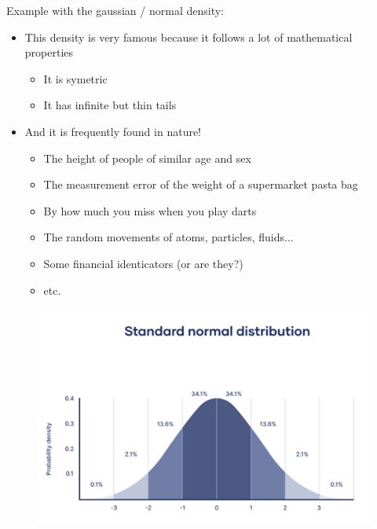 \documentclass[compress]{beamer}
\begin{document}
\begin{frame}
	Example with the gaussian / normal density:
	\vspace{0.2cm}
	\begin{itemize}
		\item This density is very famous because it follows a lot of mathematical properties
		\begin{itemize}
			\item It is symetric
			\item It has infinite but thin tails
		\end{itemize}
		\vspace{0.2cm}
		\item And it is frequently found in nature!
		\begin{itemize}
			\item The height of people of similar age and sex
			\item The measurement error of the weight of a supermarket pasta bag
			\item By how much you miss when you play darts
			\item The random movements of atoms, particles, fluids...
			\item Some financial identicators (or are they?)
			\item etc.
		\end{itemize}
	\end{itemize}
\end{frame}

\begin{frame}
	\begin{figure}
		\centering
		\includegraphics[scale=0.8]{Picture/exemple normal density.PNG}
	\end{figure}
\end{frame}
\end{document}
